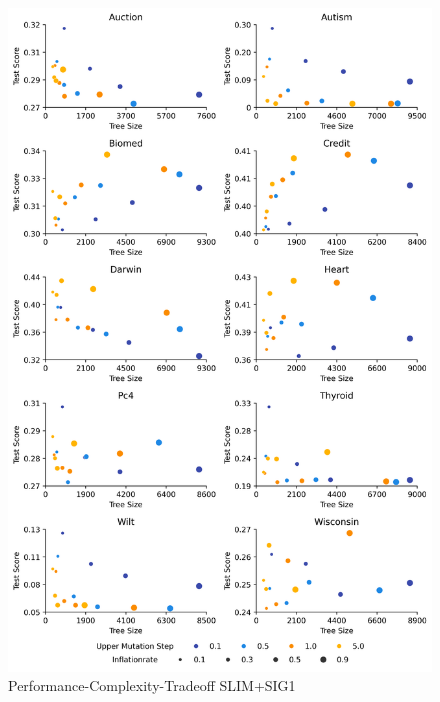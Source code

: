
    \begin{figure}[H]
    \centering
    \includegraphics[width=\linewidth]{../Latex/Chapters/Figures/Results/inflationrate_performance_complexity_tradeoff_plussig1.png}
    \caption{Performance-Complexity-Tradeoff SLIM+SIG1}
    \label{fig:inflationrate_performance_complexity_tradeoff_plussig1}
    \end{figure}
    
